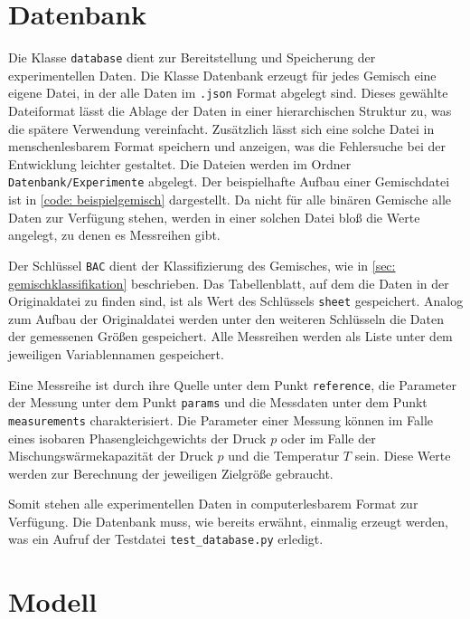\documentclass[../thesis.tex]{subfiles}
\begin{document}
\section{Datenbank}

Die Klasse \texttt{database} dient zur Bereitstellung und Speicherung der experimentellen Daten. Die Klasse Datenbank erzeugt für jedes Gemisch eine eigene Datei, in der alle Daten im \texttt{.json} Format abgelegt sind. Dieses gewählte Dateiformat lässt die Ablage der Daten in einer hierarchischen Struktur zu, was die spätere Verwendung vereinfacht. Zusätzlich lässt sich eine solche Datei in menschenlesbarem Format speichern und anzeigen, was die Fehlersuche bei der Entwicklung leichter gestaltet. Die Dateien werden im Ordner \texttt{Datenbank/Experimente} abgelegt. Der beispielhafte Aufbau einer Gemischdatei ist in \autoref{code: beispielgemisch} dargestellt. Da nicht für alle binären Gemische alle Daten zur Verfügung stehen, werden in einer solchen Datei bloß die Werte angelegt, zu denen es Messreihen gibt.


\label{code: beispielgemisch}

Der Schlüssel \texttt{BAC} dient der Klassifizierung des Gemisches, wie in \autoref{sec: gemischklassifikation} beschrieben. Das Tabellenblatt, auf dem die Daten in der Originaldatei zu finden sind, ist als Wert des Schlüssels \texttt{sheet} gespeichert. Analog zum Aufbau der Originaldatei werden unter den weiteren Schlüsseln die Daten der gemessenen Größen gespeichert. Alle Messreihen werden als Liste unter dem jeweiligen Variablennamen gespeichert.

Eine Messreihe ist durch ihre Quelle unter dem Punkt \texttt{reference}, die Parameter der Messung unter dem Punkt \texttt{params} und die Messdaten unter dem Punkt \texttt{measurements} charakterisiert. Die Parameter einer Messung können im Falle eines isobaren Phasengleichgewichts der Druck $ p $ oder im Falle der Mischungswärmekapazität der Druck $ p $ und die Temperatur $ T $ sein. Diese Werte werden zur Berechnung der jeweiligen Zielgröße gebraucht. 

Somit stehen alle experimentellen Daten in computerlesbarem Format zur Verfügung. Die Datenbank muss, wie bereits erwähnt, einmalig erzeugt werden, was ein Aufruf der Testdatei \texttt{test\_database.py} erledigt.

\section{Modell}
\end{document}
